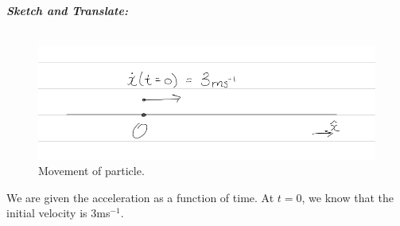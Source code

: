 %
%
%


\begin{subquestions}
	
\subquestion

\begin{subsubquestions}
	
\subsubquestion

\textbf{\textit{Sketch and Translate:}} \\ \\
\begin{figure}[H]
	\begin{center}
		\includegraphics[scale=0.25]{../2009/figures/2009q6-1}
		\caption{\label{2009:q6:Sketch1} Movement of particle.}
	\end{center}
\end{figure}
We are given the acceleration as a function of time. At $t=0$, we know that the initial velocity is 3ms$^{-1}$.
	
	
	

\end{subsubquestions}
\end{subquestions}
